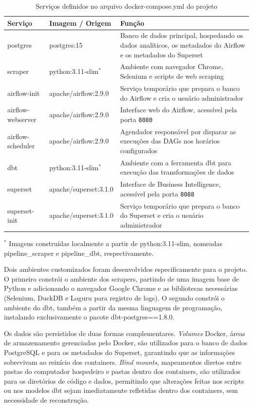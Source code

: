 \begin{table}[H]
\centering
\caption{Serviços definidos no arquivo docker-compose.yml do projeto}
\label{tab:docker_services}
\begin{tabular}{llp{6.5cm}}
\toprule
\textbf{Serviço} & \textbf{Imagem / Origem} & \textbf{Função} \\
\midrule
postgres          & postgres:15            & Banco de dados principal, hospedando os dados analíticos, os metadados do Airflow e os metadados do Superset \\
scraper           & python:3.11-slim$^{*}$ & Ambiente com navegador Chrome, Selenium e scripts de web scraping \\
airflow-init      & apache/airflow:2.9.0   & Serviço temporário que prepara o banco do Airflow e cria o usuário administrador \\
airflow-webserver & apache/airflow:2.9.0   & Interface web do Airflow, acessível pela porta \texttt{8080} \\
airflow-scheduler & apache/airflow:2.9.0   & Agendador responsável por disparar as execuções das DAGs nos horários configurados \\
dbt               & python:3.11-slim$^{*}$ & Ambiente com a ferramenta dbt para execução das transformações de dados \\
superset          & apache/superset:3.1.0  & Interface de Business Intelligence, acessível pela porta \texttt{8088} \\
superset-init     & apache/superset:3.1.0  & Serviço temporário que prepara o banco do Superset e cria o usuário administrador \\
\bottomrule
\end{tabular}

\footnotesize{$^{*}$ Imagens construídas localmente a partir de python:3.11-slim,
nomeadas pipeline\_scraper e pipeline\_dbt, respectivamente.}
\end{table}

Dois ambientes customizados foram desenvolvidos especificamente para o projeto. O primeiro
constrói o ambiente dos scrapers, partindo de uma imagem base  de Python e
adicionando o navegador Google Chrome e as bibliotecas necessárias (Selenium, DuckDB e Loguru
para registro de logs). O segundo constrói o ambiente do dbt, também a partir da mesma linguagem de programação, instalando exclusivamente o pacote dbt-postgres==1.8.0.

Os dados são persistidos de duas formas complementares. \textit{Volumes} Docker, áreas de
armazenamento gerenciadas pelo Docker, são utilizados para o banco de dados PostgreSQL e
para os metadados do Superset, garantindo que as informações sobrevivam ao reinício dos
containers. \textit{Bind mounts}, mapeamentos diretos entre pastas do computador hospedeiro
e pastas dentro dos containers, são utilizados para os diretórios de código e dados,
permitindo que alterações feitas nos scripts ou nos modelos dbt sejam imediatamente refletidas
dentro dos containers, sem necessidade de reconstrução.

